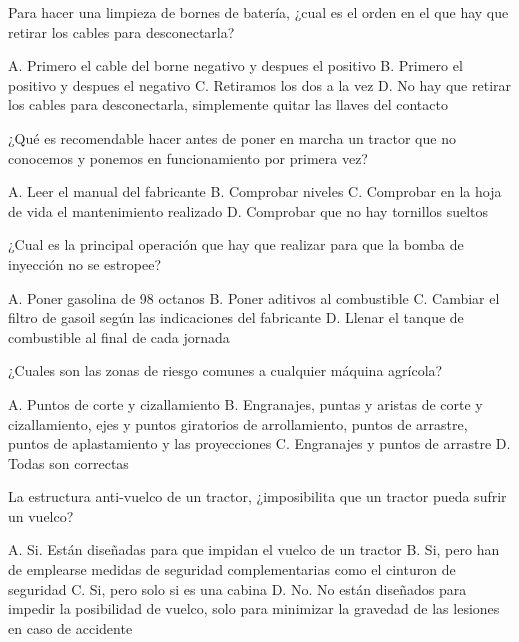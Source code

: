 \documentclass[answers,11pt]{exam}
\begin{document}
{\begin{questions}
\question Para hacer una limpieza de bornes de batería, ¿cual es el orden en el que hay que retirar los cables para desconectarla?
\begin{checkboxes}
\CorrectChoice A. Primero el cable del borne negativo y despues el positivo
\choice B. Primero el positivo y despues el negativo
\choice C. Retiramos los dos a la vez
\choice D. No hay que retirar los cables para desconectarla, simplemente quitar las llaves del contacto
\end{checkboxes}

\question ¿Qué es recomendable hacer antes de poner en marcha un tractor que no conocemos y ponemos en funcionamiento por primera vez?
\begin{checkboxes}
\CorrectChoice A. Leer el manual del fabricante
\choice B. Comprobar niveles
\choice C. Comprobar en la hoja de vida el mantenimiento realizado
\choice D. Comprobar que no hay tornillos sueltos
\end{checkboxes}

\question ¿Cual es la principal operación que hay que realizar para  que la bomba de inyección no se estropee?
\begin{checkboxes}
\choice A. Poner gasolina de 98 octanos
\choice B. Poner aditivos al combustible
\CorrectChoice C. Cambiar el filtro de gasoil según las indicaciones del fabricante
\choice D. Llenar el tanque de combustible al final de cada jornada
\end{checkboxes}
\newpage 

\question ¿Cuales son las zonas de riesgo comunes a cualquier máquina agrícola?
\begin{checkboxes}
\choice A. Puntos de corte y cizallamiento
\CorrectChoice B. Engranajes, puntas y aristas de corte y cizallamiento, ejes y puntos giratorios de arrollamiento, puntos de arrastre, puntos de aplastamiento y las proyecciones
\choice C. Engranajes y puntos de arrastre
\choice D. Todas son correctas
\end{checkboxes}

\question La estructura anti-vuelco de un tractor, ¿imposibilita que un tractor pueda sufrir un vuelco?
\begin{checkboxes}
\choice A. Si. Están diseñadas para que impidan el vuelco de un tractor
\choice B. Si, pero han de emplearse medidas de seguridad complementarias como el cinturon de seguridad
\choice C. Si, pero solo si es una cabina
\CorrectChoice D. No. No están diseñados para impedir la posibilidad de vuelco, solo para minimizar la gravedad de las lesiones en caso de accidente
\end{checkboxes}


\end{questions}}
\end{document}
